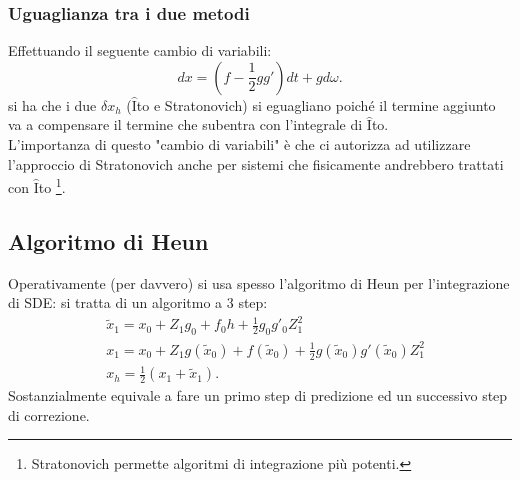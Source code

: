 \subsubsection{Uguaglianza tra i due metodi}%
\label{subsub:Uguaglianza tra i due metodi}
Effettuando il seguente cambio di variabili:
\[
    dx = \left(f-\frac{1}{2}gg'\right)dt + gd\omega
.\] 
si ha che i due $\delta x_h$ ($\hat{\text{I}}$to e Stratonovich) si eguagliano poiché il termine aggiunto va a compensare il termine che subentra con l'integrale di $\hat{\text{I}}$to.\\
L'importanza di questo "cambio di variabili" è che ci autorizza ad utilizzare l'approccio di Stratonovich anche per sistemi che fisicamente andrebbero trattati con $\hat{\text{I}}$to
\footnote{Stratonovich permette algoritmi di integrazione più potenti.}.
\subsection{Algoritmo di Heun}%
\label{sub:Algoritmo di Heun}
Operativamente (per davvero) si usa spesso l'algoritmo di Heun per l'integrazione di SDE: si tratta di un algoritmo a 3 step:
\[\begin{aligned}
    & \tilde{x}_1 = x_0 + Z_1g_0 + f_0 h  + \frac{1}{2}g_0g'_0 Z_1^2\\
    & x_1 = x_0 + Z_1 g(\tilde{x}_0) + f(\tilde{x}_0)  + \frac{1}{2}g(\tilde{x}_0) g'(\tilde{x}_0) Z_1^2\\
    & x_h = \frac{1}{2}\left(x_1+ \tilde{x}_1\right)
.\end{aligned}\]
Sostanzialmente equivale a fare un primo step di predizione ed un successivo step di correzione.
\clearpage
